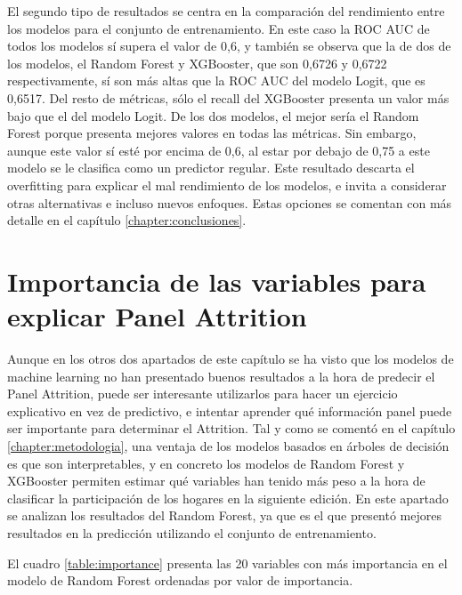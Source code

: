 El segundo tipo de resultados se centra en la comparación del rendimiento entre los modelos para el conjunto de entrenamiento. En este caso la ROC AUC de todos los modelos sí supera el valor de 0,6, y también se observa que la de dos de los modelos, el Random Forest y XGBooster, que son 0,6726 y 0,6722 respectivamente, sí son más altas que la ROC AUC del modelo Logit, que es 0,6517. Del resto de métricas, sólo el recall del XGBooster presenta un valor más bajo que el del modelo Logit. De los dos modelos, el mejor sería el Random Forest porque presenta mejores valores en todas las métricas. Sin embargo, aunque este valor sí esté por encima de 0,6, al estar por debajo de 0,75 a este modelo se le clasifica como un predictor regular. Este resultado descarta el overfitting para explicar el mal rendimiento de los modelos, e invita a considerar otras alternativas e incluso nuevos enfoques. Estas opciones se comentan con más detalle en el capítulo \ref{chapter:conclusiones}.

\section{Importancia de las variables para explicar Panel Attrition}

Aunque en los otros dos apartados de este capítulo se ha visto que los modelos de machine learning no han presentado buenos resultados a la hora de predecir el Panel Attrition, puede ser interesante utilizarlos para hacer un ejercicio explicativo en vez de predictivo, e intentar aprender qué información panel puede ser importante para determinar el Attrition. Tal y como se comentó en el capítulo \ref{chapter:metodologia}, una ventaja de los modelos basados en árboles de decisión es que son interpretables, y en concreto los modelos de Random Forest y XGBooster permiten estimar qué variables han tenido más peso a la hora de clasificar la participación de los hogares en la siguiente edición. En este apartado se analizan los resultados del Random Forest, ya que es el que presentó mejores resultados en la predicción utilizando el conjunto de entrenamiento.

El cuadro \ref{table:importance} presenta las 20 variables con más importancia en el modelo de Random Forest ordenadas por valor de importancia.

